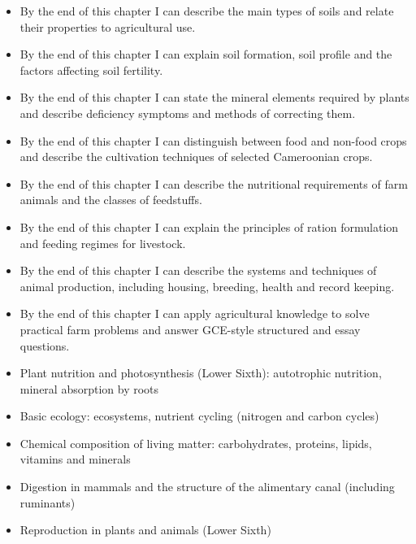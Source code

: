 \documentclass[11pt]{article}
\begin{document}
\begin{objectifs}
\begin{itemize}
\item By the end of this chapter I can describe the main types of soils and relate their properties to agricultural use.
\item By the end of this chapter I can explain soil formation, soil profile and the factors affecting soil fertility.
\item By the end of this chapter I can state the mineral elements required by plants and describe deficiency symptoms and methods of correcting them.
\item By the end of this chapter I can distinguish between food and non-food crops and describe the cultivation techniques of selected Cameroonian crops.
\item By the end of this chapter I can describe the nutritional requirements of farm animals and the classes of feedstuffs.
\item By the end of this chapter I can explain the principles of ration formulation and feeding regimes for livestock.
\item By the end of this chapter I can describe the systems and techniques of animal production, including housing, breeding, health and record keeping.
\item By the end of this chapter I can apply agricultural knowledge to solve practical farm problems and answer GCE-style structured and essay questions.
\end{itemize}
\end{objectifs}

\begin{prerequis}
\begin{itemize}
\item Plant nutrition and photosynthesis (Lower Sixth): autotrophic nutrition, mineral absorption by roots
\item Basic ecology: ecosystems, nutrient cycling (nitrogen and carbon cycles)
\item Chemical composition of living matter: carbohydrates, proteins, lipids, vitamins and minerals
\item Digestion in mammals and the structure of the alimentary canal (including ruminants)
\item Reproduction in plants and animals (Lower Sixth)
\end{itemize}
\end{prerequis}

\newpage
\end{document}
